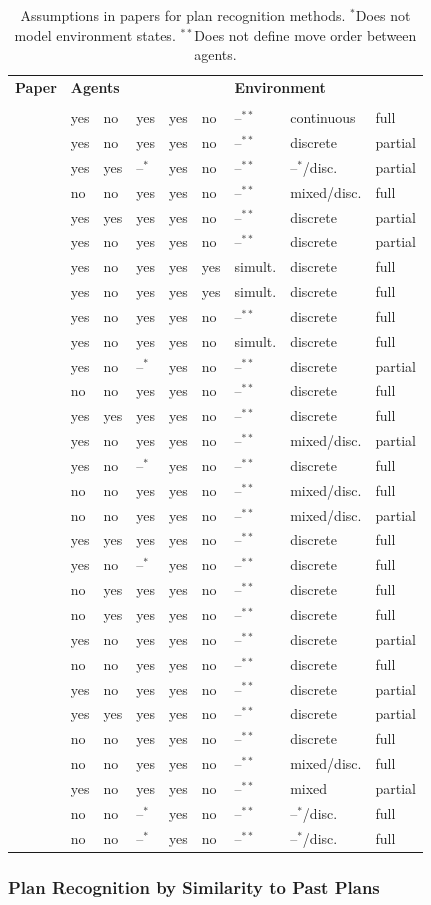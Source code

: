 \documentclass[final,1p,times,authoryear]{elsarticle}
\makeatletter
\newcommand{\nil}{@{}}
\newcommand{\nl}{\newline}
\newcommand{\rbox}[2]{\rotatebox{45}{\parbox{#1\textwidth}{#2}}}
\newcommand{\btab}{
	\center
	\scriptsize
	\bgroup\def\arraystretch{1.2}
	\begin{tabular}{\nil p{0.32\textwidth} @{\hspace{11pt}} l \nil l \nil l \nil l \nil l \nil l \nil l \nil l \nil}
		\toprule
		\bf Paper	& \multicolumn{5}{l}{\hspace{-5pt}\bf Agents} & \multicolumn{3}{l}{\hspace{-5pt}\bf Environment} \\[-5pt]
				& \rbox{0.075}{Stochastic \nl actions?} & \rbox{0.075}{Changing \nl behaviour?} & \rbox{0.075}{Factors \nl known?} & \rbox{0.07}{Independent \nl agents?} & \rbox{0.06}{Common \nl goals?} & \rbox{0.10}{Move order} & \rbox{0.11}{State/action \nl representation} & \rbox{0.09}{State/action \nl observability} \\
		\midrule}
\newcommand{\tabrow}[9]{\citep{#1} & #2 & #3 & #4 & #5 & #6 & #7 & #8 & #9 \\}
\newcommand{\etab}{
		\bottomrule
	\end{tabular}
	\egroup}
\newcommand{\si}{simult.}
\newcommand{\as}{$^{*}$}
\newcommand{\ass}{$^{**}$}
\makeatother
\begin{document}
\begin{table}[t]
	\btab
		\tabrow{vk2017}{yes}{no}{yes}{yes}{no}{--\ass}{continuous}{full}
		\tabrow{sru2016}{yes}{no}{yes}{yes}{no}{--\ass}{discrete}{partial}
		\tabrow{tzk2016}{yes}{yes}{--\as}{yes}{no}{--\ass}{--\as/disc.}{partial}
		\tabrow{fmbv2014}{no}{no}{yes}{yes}{no}{--\ass}{mixed/disc.}{full}
		\tabrow{bst2011}{yes}{yes}{yes}{yes}{no}{--\ass}{discrete}{partial}
		\tabrow{rh2011}{yes}{no}{yes}{yes}{no}{--\ass}{discrete}{partial}
		\tabrow{capir2011}{yes}{no}{yes}{yes}{yes}{\si}{discrete}{full}
		\tabrow{ft2010}{yes}{no}{yes}{yes}{yes}{\si}{discrete}{full}
		\tabrow{rg2010}{yes}{no}{yes}{yes}{no}{--\ass}{discrete}{full}
		\tabrow{g2010}{yes}{no}{yes}{yes}{no}{\si}{discrete}{full}
		\tabrow{gg2009}{yes}{no}{--\as}{yes}{no}{--\ass}{discrete}{partial}
		\tabrow{rg2009}{no}{no}{yes}{yes}{no}{--\ass}{discrete}{full}
		\tabrow{bst2009}{yes}{yes}{yes}{yes}{no}{--\ass}{discrete}{full}
		\tabrow{ak2007}{yes}{no}{yes}{yes}{no}{--\ass}{mixed/disc.}{partial}
		\tabrow{ba2006}{yes}{no}{--\as}{yes}{no}{--\ass}{discrete}{full}
		\tabrow{ak2005}{no}{no}{yes}{yes}{no}{--\ass}{mixed/disc.}{full}
		\tabrow{akz2005}{no}{no}{yes}{yes}{no}{--\ass}{mixed/disc.}{partial}
		\tabrow{bts2005}{yes}{yes}{yes}{yes}{no}{--\ass}{discrete}{full}
		\tabrow{ba2004,ba2003}{yes}{no}{--\as}{yes}{no}{--\ass}{discrete}{full}
		\tabrow{fc2003}{no}{yes}{yes}{yes}{no}{--\ass}{discrete}{full}
		\tabrow{kc2003}{no}{yes}{yes}{yes}{no}{--\ass}{discrete}{full}
		\tabrow{bvw2002}{yes}{no}{yes}{yes}{no}{--\ass}{discrete}{partial}
		\tabrow{h2001,h2000}{no}{no}{yes}{yes}{no}{--\ass}{discrete}{full}
		\tabrow{pw2000}{yes}{no}{yes}{yes}{no}{--\ass}{discrete}{partial}
		\tabrow{azn1998,aznb1997}{yes}{yes}{yes}{yes}{no}{--\ass}{discrete}{partial}
		\tabrow{le1995}{no}{no}{yes}{yes}{no}{--\ass}{discrete}{full}
		\tabrow{tr1995}{no}{no}{yes}{yes}{no}{--\ass}{mixed/disc.}{full}
		\tabrow{bcdk1994}{yes}{no}{yes}{yes}{no}{--\ass}{mixed}{partial}
		\tabrow{cg1993}{no}{no}{--\as}{yes}{no}{--\ass}{--\as/disc.}{full}
		\tabrow{ka1986}{no}{no}{--\as}{yes}{no}{--\ass}{--\as/disc.}{full}
	\etab
	\caption{Assumptions in papers for plan recognition methods. \as Does not model environment states. \ass Does not define move order between agents.}
	\label{tab:planrec}
\end{table}


			\subsubsection{Plan Recognition by Similarity to Past Plans}
\end{document}
